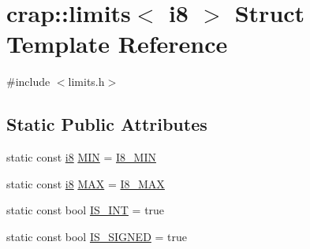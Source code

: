 \hypertarget{structcrap_1_1limits_3_01i8_01_4}{\section{crap\-:\-:limits$<$ i8 $>$ Struct Template Reference}
\label{structcrap_1_1limits_3_01i8_01_4}
}


{\ttfamily \#include $<$limits.\-h$>$}

\subsection*{Static Public Attributes}
\begin{DoxyCompactItemize}
\item 
static const \hyperlink{types_8h_ae3702327b5f47e83b431e22b33da7b58}{i8} \hyperlink{structcrap_1_1limits_3_01i8_01_4_af0166184f7c1640d6c55d91aec23122c}{M\-I\-N} = \hyperlink{types_8h_a50b6c3c5a46f347eb58da649285ddaa8}{I8\-\_\-\-M\-I\-N}
\item 
static const \hyperlink{types_8h_ae3702327b5f47e83b431e22b33da7b58}{i8} \hyperlink{structcrap_1_1limits_3_01i8_01_4_a9a112176e132c99e9a942394b144358d}{M\-A\-X} = \hyperlink{types_8h_a06aab1f97b965931eb9b623f9cc4952d}{I8\-\_\-\-M\-A\-X}
\item 
static const bool \hyperlink{structcrap_1_1limits_3_01i8_01_4_a51f3d21ce69742a7573fccdefbcd850a}{I\-S\-\_\-\-I\-N\-T} = true
\item 
static const bool \hyperlink{structcrap_1_1limits_3_01i8_01_4_aaaca3b4f389d55b8d647c522f13c1c37}{I\-S\-\_\-\-S\-I\-G\-N\-E\-D} = true
\end{DoxyCompactItemize}


